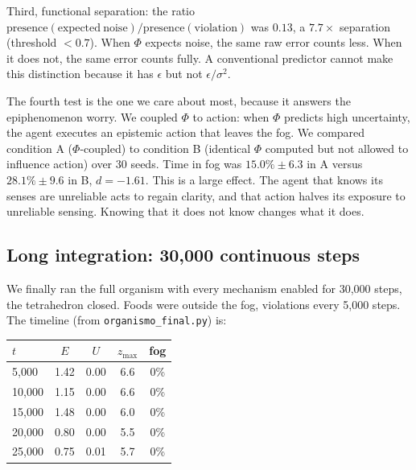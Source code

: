 \documentclass[11pt,a4paper]{article}
\begin{document}
Third, functional separation: the ratio $\mathrm{presence}(\mathrm{expected\ noise})/\mathrm{presence}(\mathrm{violation})$ was $0.13$, a $7.7\times$ separation (threshold $<0.7$). When $\Phi$ expects noise, the same raw error counts less. When it does not, the same error counts fully. A conventional predictor cannot make this distinction because it has $\epsilon$ but not $\epsilon/\sigma^2$.

The fourth test is the one we care about most, because it answers the epiphenomenon worry. We coupled $\Phi$ to action: when $\Phi$ predicts high uncertainty, the agent executes an epistemic action that leaves the fog. We compared condition A ($\Phi$-coupled) to condition B (identical $\Phi$ computed but not allowed to influence action) over 30 seeds. Time in fog was $15.0\% \pm 6.3$ in A versus $28.1\% \pm 9.6$ in B, $d=-1.61$. This is a large effect. The agent that knows its senses are unreliable acts to regain clarity, and that action halves its exposure to unreliable sensing. Knowing that it does not know changes what it does.

\subsection{Long integration: 30,000 continuous steps}

We finally ran the full organism with every mechanism enabled for 30,000 steps, the tetrahedron closed. Foods were outside the fog, violations every 5,000 steps. The timeline (from \texttt{organismo\_final.py}) is:

\begin{center}
\begin{tabular}{lcccc}
\toprule
$t$ & $E$ & $U$ & $z_{\max}$ & fog \\
\midrule
5,000 & 1.42 & 0.00 & 6.6 & 0\% \\
10,000 & 1.15 & 0.00 & 6.6 & 0\% \\
15,000 & 1.48 & 0.00 & 6.0 & 0\% \\
20,000 & 0.80 & 0.00 & 5.5 & 0\% \\
25,000 & 0.75 & 0.01 & 5.7 & 0\% \\
\bottomrule
\end{tabular}
\end{center}
\end{document}
